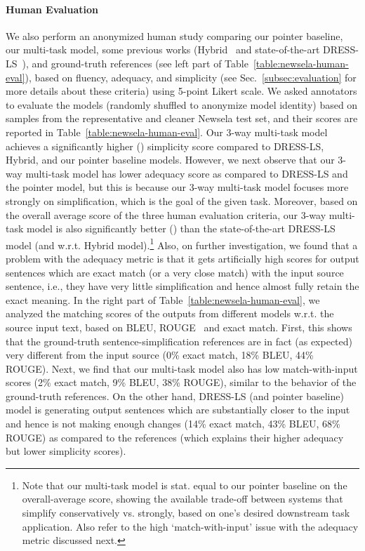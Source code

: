 \documentclass[11pt]{article}
\begin{document}
\paragraph{Human Evaluation}
We also perform an anonymized human study comparing our pointer baseline, our multi-task model, some previous works (Hybrid~\cite{Narayan2014HybridSU} and state-of-the-art DRESS-LS~\cite{zhang2017dress}), and ground-truth references (see left part of Table~\ref{table:newsela-human-eval}), based on fluency, adequacy, and simplicity (see Sec.~\ref{subsec:evaluation} for more details about these criteria) using 5-point Likert scale. We asked annotators to evaluate the models (randomly shuffled to anonymize model identity) based on  samples from the representative and cleaner Newsela test set, and their scores are reported in Table~\ref{table:newsela-human-eval}.
Our 3-way multi-task model achieves a significantly higher () simplicity score compared to DRESS-LS, Hybrid, and our pointer baseline models. 
However, we next observe that our 3-way multi-task model has lower adequacy score as compared to DRESS-LS and the pointer model, but this is because our 3-way multi-task model focuses more strongly on simplification, which is the goal of the given task. 
Moreover, based on the overall average score of the three human evaluation criteria, our 3-way multi-task model is also significantly better () than the state-of-the-art DRESS-LS model (and  w.r.t. Hybrid model).\footnote{Note that our multi-task model is stat. equal to our pointer baseline on the overall-average score, showing the available trade-off between systems that simplify conservatively vs. strongly, based on one's desired downstream task application. Also refer to the high `match-with-input' issue with the adequacy metric discussed next.} 
Also, on further investigation, we found that a problem with the adequacy metric is that it gets artificially high scores for output sentences which are exact match (or a very close match) with the input source sentence, i.e., they have very little simplification and hence almost fully retain the exact meaning. In the right part of Table~\ref{table:newsela-human-eval}, we analyzed the matching scores of the outputs from different models w.r.t. the source input text, based on BLEU, ROUGE~\cite{lin2004rouge} and exact match. First, this shows that the ground-truth sentence-simplification references are in fact (as expected) very different from the input source (0\% exact match, 18\% BLEU, 44\% ROUGE). Next, we find that our multi-task model also has low match-with-input scores (2\% exact match, 9\% BLEU, 38\% ROUGE), similar to the behavior of the ground-truth references. On the other hand, DRESS-LS (and pointer baseline) model is generating output sentences which are substantially closer to the input and hence is not making enough changes (14\% exact match, 43\% BLEU, 68\% ROUGE) as compared to the references (which explains their higher adequacy but lower simplicity scores).
 
\end{document}
